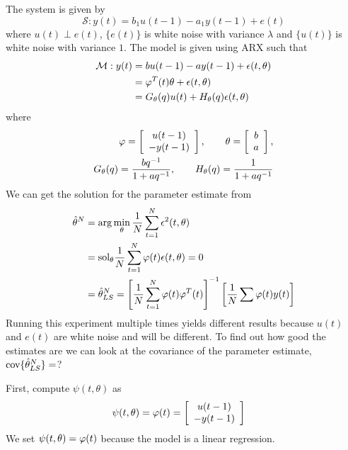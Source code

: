 \begin{example}
\label{ex:15arx}
The system is given by
$$\mathcal{S}: y(t) = b_1u(t-1)-a_1y(t-1)+e(t)$$
where $u(t)\perp e(t)$, $\{e(t)\}$ is white noise with variance $\lambda$ and $\{u(t)\}$ is white noise with variance $1$.
The model is given using ARX such that
\begin{align*}
\mathcal{M}: y(t) &= bu(t-1)-ay(t-1)+\epsilon(t,\theta) \\
&= \varphi^T(t)\theta+\epsilon(t,\theta) \\
&= G_\theta(q)u(t) + H_\theta(q)\epsilon(t,\theta)
\end{align*}
where
\begin{align*}
\varphi = \left[\begin{array}{c} u(t-1) \\ -y(t-1) \end{array}\right], \qquad \theta= \left[\begin{array}{c} b \\ a \end{array}\right], \\ G_\theta(q) = \frac{bq^{-1}}{1+aq^{-1}}, \qquad H_\theta(q) = \frac{1}{1+aq^{-1}}
\end{align*}
We can get the solution for the parameter estimate from
\begin{align*}
\hat{\theta}^N &= \arg\min_\theta\frac{1}{N}\sum_{t=1}^N\epsilon^2(t,\theta) \\
&= \text{sol}_\theta\frac{1}{N}\sum_{t=1}^N\varphi(t)\epsilon(t,\theta) = 0 \\
&= \hat{\theta}_{LS}^N = {\left[\frac{1}{N}\sum_{t=1}^N\varphi(t)\varphi^T(t)\right]}^{-1}\left[\frac{1}{N}\sum\varphi(t)y(t)\right]
\end{align*}
Running this experiment multiple times yields different results because $u(t)$ and $e(t)$ are white noise and will be different.
To find out how good the estimates are we can look at the covariance of the parameter estimate, $\text{cov}\{\hat{\theta}_{LS}^N\}=$?

First, compute $\psi(t,\theta)$ as
\begin{align*}
\psi(t,\theta) &= \varphi(t) = \left[\begin{array}{c} u(t-1) \\ -y(t-1) \end{array}\right]
\end{align*}
We set $\psi(t,\theta)=\varphi(t)$ because the model is a linear regression.


\end{example}
